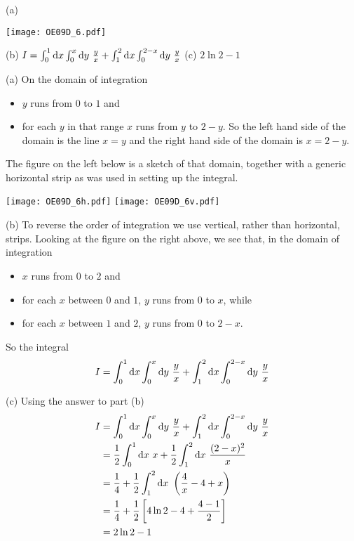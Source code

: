 %

\begin{answer}
(a)
\begin{center}
     \texttt{[image: OE09D\_6.pdf]}
\end{center}

(b) $I=\int_0^1\dee{x}\int_0^x\dee{y}\ \frac{y}{x}
  +\int_1^2\dee{x}\int_0^{2-x}\dee{y}\ \frac{y}{x}$\qquad
(c) $2\ln 2 -1$
\end{answer}

\begin{solution}
(a) On the domain of integration
\begin{itemize}
\item
$y$ runs from $0$ to $1$ and
\item
for each $y$ in that range $x$ runs from $y$ to $2-y$.
So the left hand side of the domain is the line $x=y$ and 
the right hand side of the domain is $x=2-y$.
\end{itemize}
The figure on the left below is a sketch of that domain, together with 
a generic horizontal strip as was used in setting up the integral.

\begin{center}
     \texttt{[image: OE09D\_6h.pdf]}\qquad
     \texttt{[image: OE09D\_6v.pdf]}\qquad
\end{center}

(b) 
To reverse the order of integration we use vertical, rather than horizontal, strips. Looking at the figure on the right above, we see that, in the
domain of integration
\begin{itemize}
\item
$x$ runs from $0$ to $2$ and
\item
for each $x$ between $0$ and $1$, $y$ runs from $0$ to $x$, while
\item
for each $x$ between $1$ and $2$, $y$ runs from $0$ to $2-x$.
\end{itemize}
So the integral
\begin{align*}
I=\int_0^1\mathrm{d}x\int_0^x\mathrm{d}y\ \frac{y}{x}
  +\int_1^2\mathrm{d}x\int_0^{2-x}\mathrm{d}y\ \frac{y}{x} 
\end{align*}

(c) Using the answer to part (b)
\begin{align*}
I&=\int_0^1\dee{x}\int_0^x\dee{y}\ \frac{y}{x}
  +\int_1^2\dee{x}\int_0^{2-x}\dee{y}\ \frac{y}{x} \\
&=\frac{1}{2}\int_0^1\dee{x}\ x
    +\frac{1}{2}\int_1^2\dee{x}\ \frac{(2-x)^2}{x}\\
&=\frac{1}{4} +\frac{1}{2}\int_1^2\dee{x}\ \left(\frac{4}{x}-4+x\right) \\
&=\frac{1}{4} +\frac{1}{2}\left[4\ln 2 -4 + \frac{4-1}{2}\right] \\
&=2\ln 2 -1
\end{align*}
\end{solution}


